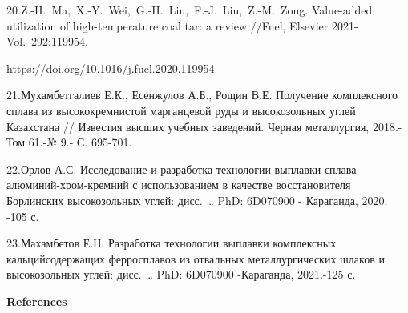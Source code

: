 \begin{noparindent}
20.Z.-H.~Ma,~X.-Y.~Wei,~G.-H.~Liu,~F.-J.~Liu,~Z.-M.~Zong. Value-added
utilization of high-temperature coal tar: a review //Fuel, Elsevier
2021- Vol.~292:119954.

https://doi.org/10.1016/j.fuel.2020.119954

21.Мухамбетгалиев Е.К., Есенжулов А.Б., Рощин В.Е. Получение
комплексного сплава из высококремнистой марганцевой руды и высокозольных
углей Казахстана // Известия высших учебных заведений. Черная
металлургия, 2018.-Том 61.-№ 9.- С. 695-701.

22.Орлов А.С. Исследование и разработка технологии выплавки сплава
алюминий-хром-кремний с использованием в качестве восстановителя
Борлинских высокозольных углей: дисс. \ldots{} PhD: 6D070900 -
Караганда, 2020. -105 с.

23.Махамбетов Е.Н. Разработка технологии выплавки комплексных
кальцийсодержащих ферросплавов из отвальных металлургических шлаков и
высокозольных углей: дисс. \ldots{} PhD: 6D070900 -Караганда, 2021.-125
с.
\end{noparindent}

\begin{center}
{\bfseries References}
\end{center}

